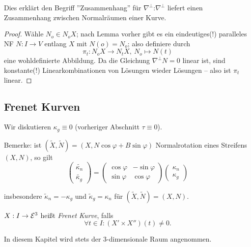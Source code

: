 \begin{remark}
	Dies erklärt den Begriff ''Zusammenhang'' für $\nabla^\perp$:$\nabla^\perp$ liefert einen Zusammenhang zwischen Normalräumen einer Kurve.
\end{remark}

\begin{proof}
	Wähle $N_o \in N_oX$; nach Lemma vorher gibt es ein eindeutiges(!) paralleles NF $N : I \rightarrow V$ entlang $X$ mit $N(o) = N_o$; also definiere durch 
	\[\pi_t: N_oX \rightarrow N_t X,~ N_o \mapsto N(t)  \] eine wohldefinierte Abbildung. Da die Gleichung $\nabla^\perp N = 0$ linear ist, sind konstante(!) Linearkombinationen von Lösungen wieder Lösungen -- also ist $\pi_t$ linear.
\end{proof}

\subsection{Frenet Kurven}

Wir diskutieren $\kappa_g \equiv 0$ (vorheriger Abschnitt $\tau \equiv 0$).

Bemerke: ist $(\widetilde{X},\widetilde{N}) =(X,N \cos \varphi + B \sin \varphi )$ Normalrotation eines Streifens $(X,N)$, so gilt 
\begin{equation*}
\begin{pmatrix} 
\widetilde{\kappa_n}\\
\widetilde{\kappa_g}
\end{pmatrix}
=
\begin{pmatrix} 
\cos \varphi & - \sin \varphi \\
\sin \varphi & \cos \varphi
\end{pmatrix}
\begin{pmatrix}
\kappa_n\\
\kappa_g
\end{pmatrix}
\end{equation*}

insbesondere $\widetilde{\kappa}_n = - \kappa_g $ und  $\widetilde{\kappa}_g = \kappa_n$
für $(\widetilde{X}, \widetilde{N}) = (X,N)$.

\begin{definition}
	$X: I \rightarrow \mathcal E^3$ heißt \emph{Frenet Kurve}, falls \[ \forall t \in I: (X' \times X'')(t) \not = 0. \]
\end{definition}

\begin{remark}
	In diesem Kapitel wird stets der 3-dimensionale Raum angenommen.
\end{remark}

